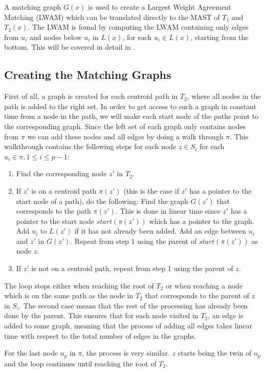 A matching graph $G(x)$ is used to create a Largest Weight Agreement Matching (LWAM) which can be translated directly to the MAST of $T_1$ and $T_2(x)$. The LWAM is found by computing the LWAM containing only edges from $u_i$ and nodes below $u_i$ in $L(x)$, for each $u_i \in L(x)$, starting from the bottom. This will be covered in detail in .

\subsection{Creating the Matching Graphs}
First of all, a graph is created for each centroid path in $T_2$, where all nodes in the path is added to the right set. In order to get access to such a graph in constant time from a node in the path, we will make each start node of the paths point to the corresponding graph.
Since the left set of each graph only contains nodes from $\pi$ we can add these nodes and all edges by doing a walk through $\pi$. This walkthrough contains the following steps for each node $z \in S_i$ for each $u_i \in \pi, 1 \le i \le p-1$:

\begin{enumerate}
	\item Find the corresponding node $z'$ in $T_2$.
	\item If $z'$ is on a centroid path $\pi(z')$ (this is the case if $z'$ has a pointer to the start node of a path), do the following:
	\subitem Find the graph $G(z')$ that corresponds to the path $\pi(z')$. This is done in linear time since $z'$ has a pointer to the start node $start(\pi(z'))$ which has a pointer to the graph.
	\subitem Add $u_i$ to $L(z')$ if it has not already been added.
	\subitem Add an edge between $u_i$ and $z'$ in $G(z')$.
	\subitem Repeat from step 1 using the parent of $start(\pi(z'))$ as node $z$.
	\item If $z'$ is not on a centroid path, repeat from step 1 using the parent of $z$.
\end{enumerate}
The loop stops either when reaching the root of $T_2$ or when reaching a node which is on the same path as the node in $T_2$ that corresponds to the parent of $z$ in $S_i$. The second case means that the rest of the processing has already been done by the parent. This ensures that for each node visited in $T_2$, an edge is added to some graph, meaning that the process of adding all edges takes linear time with respect to the total number of edges in the graphs.

For the last node $u_p$ in $\pi$, the process is very similar. $z$ starts being the twin of $u_p$ and the loop continues until reaching the root of $T_2$.\\


